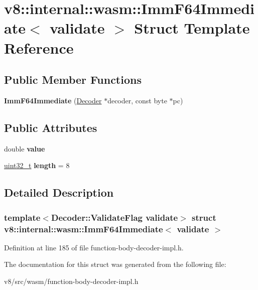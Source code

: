 \hypertarget{structv8_1_1internal_1_1wasm_1_1ImmF64Immediate}{}\section{v8\+:\+:internal\+:\+:wasm\+:\+:Imm\+F64\+Immediate$<$ validate $>$ Struct Template Reference}
\label{structv8_1_1internal_1_1wasm_1_1ImmF64Immediate}
\subsection*{Public Member Functions}
\begin{DoxyCompactItemize}
\item 
\mbox{\label{structv8_1_1internal_1_1wasm_1_1ImmF64Immediate_a4b3cde5fc58403cfc9e4434fd509b11a}} 
{\bfseries Imm\+F64\+Immediate} (\mbox{\hyperlink{classv8_1_1internal_1_1wasm_1_1Decoder}{Decoder}} $\ast$decoder, const byte $\ast$pc)
\end{DoxyCompactItemize}
\subsection*{Public Attributes}
\begin{DoxyCompactItemize}
\item 
\mbox{\label{structv8_1_1internal_1_1wasm_1_1ImmF64Immediate_a680bf982204f576468831d3de2793ca4}} 
double {\bfseries value}
\item 
\mbox{\label{structv8_1_1internal_1_1wasm_1_1ImmF64Immediate_a56b51cb8049b4ad653e06a11257cd2ec}} 
\mbox{\hyperlink{classuint32__t}{uint32\+\_\+t}} {\bfseries length} = 8
\end{DoxyCompactItemize}


\subsection{Detailed Description}
\subsubsection*{template$<$Decoder\+::\+Validate\+Flag validate$>$\newline
struct v8\+::internal\+::wasm\+::\+Imm\+F64\+Immediate$<$ validate $>$}



Definition at line 185 of file function-\/body-\/decoder-\/impl.\+h.



The documentation for this struct was generated from the following file\+:\begin{DoxyCompactItemize}
\item 
v8/src/wasm/function-\/body-\/decoder-\/impl.\+h\end{DoxyCompactItemize}
